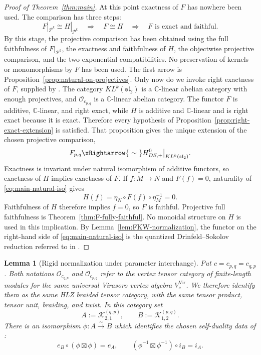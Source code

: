 \documentclass[12pt,leqno]{amsart}
\numberwithin{equation}{section}
\newtheorem{lem}[thm]{Lemma}
\newcommand{\KL}{KL}
\newcommand{\Oc}{\mathcal O}
\def\C{\mathbb{C}}
\begin{document}
\begin{proof}[Proof of Theorem~\ref{thm:main}]
At this point exactness of $F$ has nowhere been used.  The comparison has
three steps:
\[
 F|_{\mathcal P^k}\cong H|_{\mathcal P^k}
 \quad\Longrightarrow\quad
 F\cong H
 \quad\Longrightarrow\quad
 F\text{ is exact and faithful}.
\]
By this stage, the projective comparison has been obtained using the full
faithfulness of $F|_{\mathcal P^k}$, the exactness and faithfulness of
$H$, the objectwise projective comparison, and the two exponential
compatibilities.  No preservation of kernels or monomorphisms by $F$ has
been used.  The first arrow is Proposition~\ref{prop:natural-on-projectives}.
Only now do we invoke right exactness of $F$, supplied by
\cite[Theorem~7.15]{McRaeYang}.  The category
$\KL^k(\mathfrak{sl}_2)$ is a $\C$-linear abelian category with enough
projectives, and $\Oc_{c_{p,q}}$ is a $\C$-linear abelian category.  The
functor $F$ is additive, $\C$-linear, and right exact, while $H$ is
additive and $\C$-linear and is right exact because it is exact.
Therefore every hypothesis of Proposition~\ref{prop:right-exact-extension}
is satisfied.  That proposition gives the unique extension of the chosen
projective comparison,
\begin{equation}\label{eq:main-natural-iso}
 F_{p,q}\xRightarrow{\ \sim\ }
 H^0_{DS,+}\big|_{\KL^k(\mathfrak{sl}_2)}.
\end{equation}
Exactness is invariant under natural isomorphism of additive functors, so
exactness of $H$ implies exactness of $F$.  If $f:M\to N$ and $F(f)=0$,
naturality of \eqref{eq:main-natural-iso} gives
\[
 H(f)=\eta_N\circ F(f)\circ\eta_M^{-1}=0.
\]
Faithfulness of $H$ therefore implies $f=0$, so $F$ is faithful.
Projective full faithfulness is Theorem~\ref{thm:F-fully-faithful}.
No monoidal structure on $H$ is used in this implication.  By
Lemma~\ref{lem:FKW-normalization}, the functor on the right-hand side of
\eqref{eq:main-natural-iso} is the quantized Drinfeld--Sokolov reduction
referred to in \cite[Conjecture~7.16]{McRaeYang}.
\end{proof}



\begin{lem}[Rigid normalization under parameter interchange]
\label{lem:parameter-swap-rigid-normalization}
Put $c=c_{p,q}=c_{q,p}$.  Both notations
$\Oc_{c_{q,p}}$ and $\Oc_{c_{p,q}}$ refer to the vertex tensor category
of finite-length modules for the same universal Virasoro vertex algebra
$V_c^{\mathrm{Vir}}$.  We therefore identify them as the same HLZ
braided tensor category, with the same tensor product, tensor unit,
braiding, and twist.  In this category set
\[
 A:=\mathcal K^{(q,p)}_{2,1},\qquad
 B:=\mathcal K^{(p,q)}_{1,2}.
\]
There is an isomorphism $\phi:A\xrightarrow{\sim}B$ which identifies the
chosen self-duality data of \cite[Theorem~7.15]{McRaeYang}:
\[
 e_B\circ(\phi\boxtimes\phi)=e_A,
 \qquad
 (\phi^{-1}\boxtimes\phi^{-1})\circ i_B=i_A.
\]
\end{lem}
\end{document}
